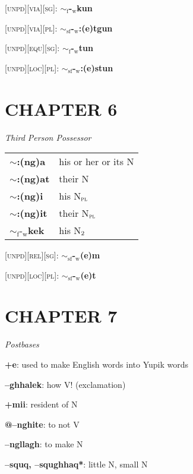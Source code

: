 \documentclass{article}
\begin{document}
\textsc{[unpd][via][sg]}: \textbf{$\sim_\text{f}$-$_\text{w}$kun}

\textsc{[unpd][via][pl]}: \textbf{$\sim_\text{sf}$-$_\text{w}$:(e)tgun}

\textsc{[unpd][equ][sg]}: \textbf{$\sim_\text{f}$-$_\text{w}$tun}

\textsc{[unpd][loc][pl]}: \textbf{$\sim_\text{sf}$-$_\text{w}$:(e)stun}

\section*{CHAPTER 6}

\textit{Third Person Possessor} \\
\begin{tabular}{ l l }
\textbf{$\sim$:(ng)a} & his or her or its N \\
\textbf{$\sim$:(ng)at} & their N \\
\textbf{$\sim$:(ng)i} & his N$_\text{\textsc{pl}}$ \\
\textbf{$\sim$:(ng)it} & their N$_\text{\textsc{pl}}$ \\
\textbf{${\sim}_\text{f}\text{-}_\text{w}$kek} & his N$_\text{\textsc{2}}$ \\
\end{tabular}

\bigskip

\textsc{[unpd][rel][sg]}: \textbf{$\sim_\text{sf}$-$_\text{w}$(e)m}

\textsc{[unpd][loc][pl]}: \textbf{$\sim_\text{sf}$-$_\text{w}$(e)t}

\section*{CHAPTER 7}

\textit{Postbases}
\begin{description}
\item \textbf{+e}: used to make English words into Yupik words
\item \textbf{--ghhalek}: how V! (exclamation)
\item \textbf{+mii}: resident of N
\item \textbf{@--nghite}: to not V
\item \textbf{--ngllagh}: to make N
\item \textbf{--squq, --squghhaq*}: little N, small N
\end{description}
\end{document}
